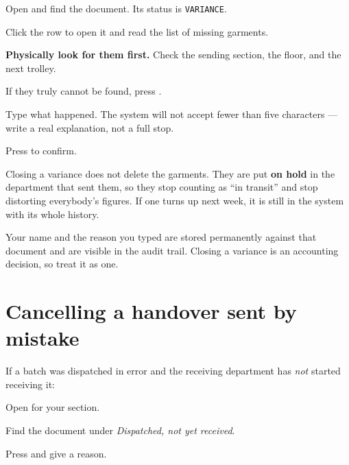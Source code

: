 \begin{steps}
  \item Open  and find the document. Its status is
        \texttt{VARIANCE}.
  \item Click the row to open it and read the list of missing garments.
  \item \textbf{Physically look for them first.} Check the sending section, the
        floor, and the next trolley.
  \item If they truly cannot be found, press .
  \item Type what happened. The system will not accept fewer than five characters
        --- write a real explanation, not a full stop.
  \item Press  to confirm.
\end{steps}


\begin{plainwords}
Closing a variance does not delete the garments. They are put \textbf{on hold} in
the department that sent them, so they stop counting as ``in transit'' and stop
distorting everybody's figures. If one turns up next week, it is still in the
system with its whole history.
\end{plainwords}

\begin{stopbox}
Your name and the reason you typed are stored permanently against that document
and are visible in the audit trail. Closing a variance is an accounting decision,
so treat it as one.
\end{stopbox}

\section{Cancelling a handover sent by mistake}

If a batch was dispatched in error and the receiving department has \emph{not}
started receiving it:

\begin{steps}
  \item Open  for your section.
  \item Find the document under \emph{Dispatched, not yet received}.
  \item Press  and give a reason.
\end{steps}

